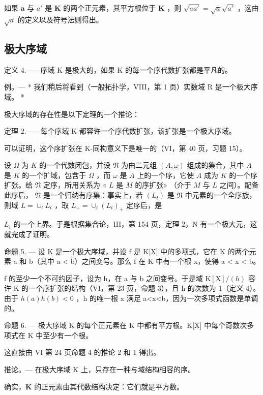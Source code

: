 如果 \(\pmb{a}\) 与 \(a'\) 是 \(\mathbf{K}\) 的两个正元素，其平方根位于 \(\mathbf{K}\) ，则 \(\sqrt{aa'} = \sqrt{a}\sqrt{a'}\) ，这由 \(\sqrt{a}\) 的定义以及符号法则得出。

\subsection{极大序域}

定义 4.——序域 K 是极大的，如果 K 的每一个序代数扩张都是平凡的。

例。--- * 我们稍后将看到（一般拓扑学，VIII，第 1 页）实数域 R 是一个极大序域。 *

极大序域的存在性是以下定理的一个推论：

定理 2.——每个序域 K 都容许一个序代数扩张，该扩张是一个极大序域。

可以证明，这个序扩张在 K-同构意义下是唯一的（VI，第 40 页，习题 15）。

设 \(\Omega\) 为 \(K\) 的一个代数闭包，并设 \(\mathfrak{N}\) 为由二元组 \((A, \omega)\) 组成的集合，其中 \(A\) 是 \(K\) 的一个扩域，包含于 \(\Omega\) ，而 \(\omega\) 是 \(A\) 上的一个序，它使 \(A\) 成为 \(K\) 的一个序扩张。给 \(\mathfrak{N}\) 定序，所用关系为 « \(L\) 是 \(M\) 的序扩张» （介于 \(M\) 与 \(L\) 之间）。配备此序后， \(\mathfrak{N}\) 是一个归纳有序集：事实上，若 \((L_{t})\) 是 \(\mathfrak{N}\) 中元素的一个全序族，则域 \(L = \cup_{t} L_{t}\) ，取 \(L_{+} = \cup_{t} (L_{t})_{+}\) 定序后，是

\(L_{i}\) 的一个上界。于是根据集合论，III，第 154 页，定理 2，N 有一个极大元，这就完成了证明。

命题 5. --- 设 K 是一个极大序域，并设 f 是 K{[}X{]} 中的多项式，它在 K 的两个元素 a 和 b（其中 a \textless{} b）之间变号。那么 f 在 K 中有一个根 x，使得 a \textless{} x \textless{} b。

f 的至少一个不可约因子，设为 h，在 a 与 b 之间变号。于是域 \(\mathrm{K}[\mathrm{X}]/(h)\) 容许 K 的一个序扩张的结构（VI，第 23 页，命题 3），且 h 的次数为 1（定义 4）。由于 \(h(a)h(b)<0\) ，h 的唯一根 x 满足 a\textless x\textless b，因为一次多项式函数是单调的。

命题 6. --- 极大序域 K 的每个正元素在 K 中都有平方根。K{[}X{]} 中每个奇数次多项式在 K 中至少有一个根。

这直接由 VI 第 24 页命题 4 的推论 2 和 1 得出。

推论。--- 在极大序域 K 上，只存在一种与域结构相容的序。

确实，\(\mathbf{K}\) 的正元素由其代数结构决定：它们就是平方数。

